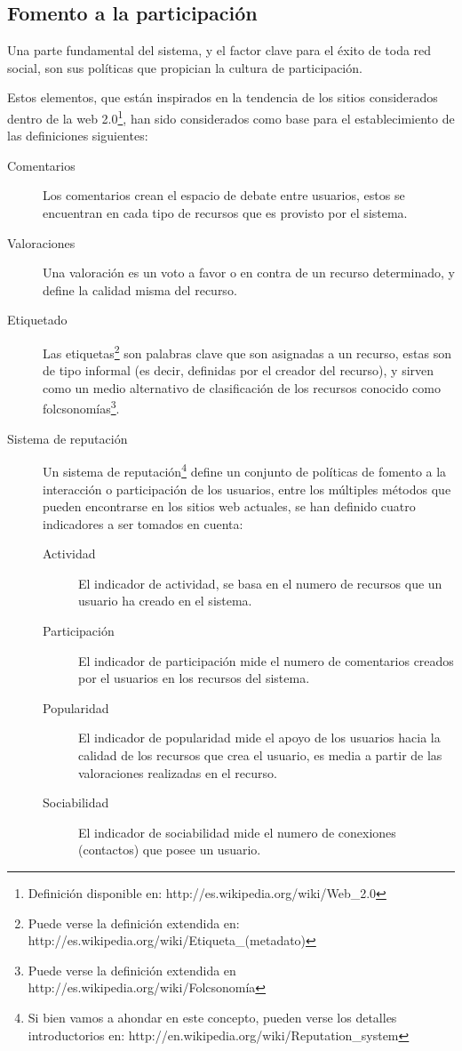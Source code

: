 \subsection{Fomento a la participación}

Una parte fundamental del sistema, y el factor clave para el éxito de toda red
social, son sus políticas que propician la cultura de participación.

Estos elementos, que están inspirados en la tendencia de los sitios considerados
dentro de la web 2.0\footnote{Definición disponible en:
http://es.wikipedia.org/wiki/Web\_2.0}, han sido considerados como base para el
establecimiento de las definiciones siguientes:

\begin{description}
\item [Comentarios] Los comentarios crean el espacio de debate entre usuarios,
estos se encuentran en cada tipo de recursos que es provisto por el sistema.
\item [Valoraciones] Una valoración es un voto a favor o en contra de un recurso
determinado, y define la calidad misma del recurso.
\item [Etiquetado] Las etiquetas\footnote{Puede verse la definición extendida
en: http://es.wikipedia.org/wiki/Etiqueta\_(metadato)} son palabras clave que
son asignadas a un recurso, estas son de tipo informal (es decir, definidas por
el creador del recurso), y sirven como un medio alternativo de clasificación de
los recursos conocido como folcsonomías\footnote{Puede verse la definición
extendida en http://es.wikipedia.org/wiki/Folcsonomía}.
\item [Sistema de reputación] Un sistema de reputación\footnote{Si bien vamos a
ahondar en este concepto, pueden verse los detalles introductorios en:
http://en.wikipedia.org/wiki/Reputation\_system} define un conjunto de políticas
de fomento a la interacción o participación de los usuarios, entre los múltiples
métodos que pueden encontrarse en los sitios web actuales, se han definido
cuatro indicadores a ser tomados en cuenta:
\begin{description}
    \item [Actividad] El indicador de actividad, se basa en el numero de
    recursos que un usuario ha creado en el sistema.
    \item [Participación] El indicador de participación mide el numero de
    comentarios creados por el usuarios en los recursos del sistema.
    \item [Popularidad] El indicador de popularidad mide el apoyo de los
    usuarios hacia la calidad de los recursos que crea el usuario, es media a
    partir de las valoraciones realizadas en el recurso.
    \item [Sociabilidad] El indicador de sociabilidad mide el numero de
    conexiones (contactos) que posee un usuario.
    \end{description}
\end{description}

